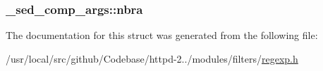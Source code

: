 \subsubsection[{\texorpdfstring{nbra}{nbra}}]{ \+\_\+sed\+\_\+comp\+\_\+args\+::nbra}\hypertarget{struct__sed__comp__args_a028c74968591ad5103b26b42ff700e4c}{}\label{struct__sed__comp__args_a028c74968591ad5103b26b42ff700e4c}


The documentation for this struct was generated from the following file\+:\begin{DoxyCompactItemize}
\item 
/usr/local/src/github/\+Codebase/httpd-\/2../modules/filters/\hyperlink{regexp_8h}{regexp.\+h}\end{DoxyCompactItemize}
